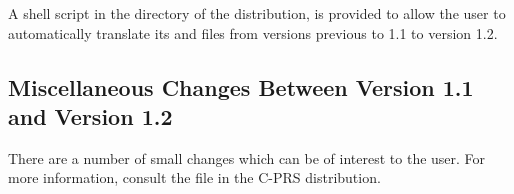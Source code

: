 A shell script  in the  directory of the
distribution, is provided to allow the user to automatically translate its
 and  files from versions previous to 1.1 to version 1.2.

\subsection{Miscellaneous Changes Between Version 1.1 and Version 1.2}

There are a number of small changes which can be of interest to the user. For
more information, consult the  file in the C-PRS distribution.

